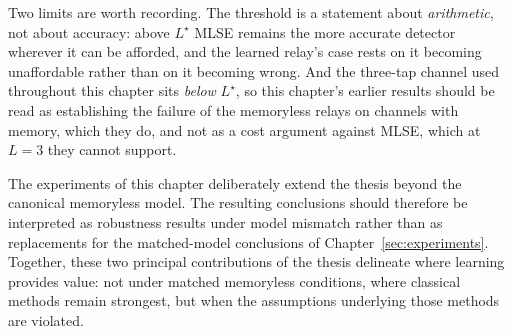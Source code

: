Two limits are worth recording. The threshold is a statement about \emph{arithmetic}, not about accuracy: above $L^{\star}$ MLSE remains the more accurate detector wherever it can be afforded, and the learned relay's case rests on it becoming unaffordable rather than on it becoming wrong. And the three-tap channel used throughout this chapter sits \emph{below} $L^{\star}$, so this chapter's earlier results should be read as establishing the failure of the memoryless relays on channels with memory, which they do, and not as a cost argument against MLSE, which at $L=3$ they cannot support.

The experiments of this chapter deliberately extend the thesis beyond the canonical memoryless model. The resulting conclusions should therefore be interpreted as robustness results under model mismatch rather than as replacements for the matched-model conclusions of Chapter~\ref{sec:experiments}. Together, these two principal contributions of the thesis delineate where learning provides value: not under matched memoryless conditions, where classical methods remain strongest, but when the assumptions underlying those methods are violated.
